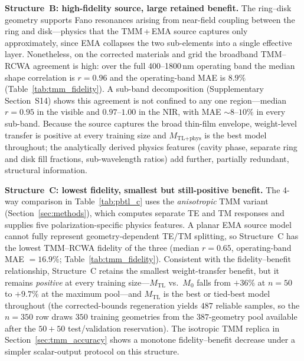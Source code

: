 \documentclass[a4paper,fleqn]{cas-sc}
\newcommand{\Mzero}{M_0}
\newcommand{\Mtl}{M_\text{TL}}
\newcommand{\Mtlphys}{M_\text{TL+phys}}
\begin{document}
\textbf{Structure~B: high-fidelity source, large retained benefit.} The ring--disk geometry supports Fano resonances arising from near-field coupling between the ring and disk---physics that the TMM\,+\,EMA source captures only approximately, since EMA collapses the two sub-elements into a single effective layer. Nonetheless, on the corrected materials and grid the broadband TMM--RCWA agreement is high: over the full 400--1800\,nm operating band the median shape correlation is $r = 0.96$ and the operating-band MAE is $8.9\%$ (Table~\ref{tab:tmm_fidelity}). A sub-band decomposition (Supplementary Section~S14) shows this agreement is not confined to any one region---median $r = 0.95$ in the visible and $0.97$--$1.00$ in the NIR, with MAE ${\sim}8$--$10\%$ in every sub-band. Because the source captures the broad thin-film envelope, weight-level transfer is positive at every training size and $\Mtlphys$ is the best model throughout; the analytically derived physics features (cavity phase, separate ring and disk fill fractions, sub-wavelength ratios) add further, partially redundant, structural information.

\textbf{Structure~C: lowest fidelity, smallest but still-positive benefit.} The 4-way comparison in Table~\ref{tab:pbtl_c} uses the \emph{anisotropic} TMM variant (Section~\ref{sec:methods}), which computes separate TE and TM responses and supplies five polarization-specific physics features. A planar EMA source model cannot fully represent geometry-dependent TE/TM splitting, so Structure~C has the lowest TMM--RCWA fidelity of the three (median $r = 0.65$, operating-band MAE $= 16.9\%$; Table~\ref{tab:tmm_fidelity}). Consistent with the fidelity--benefit relationship, Structure~C retains the smallest weight-transfer benefit, but it remains \emph{positive} at every training size---$\Mtl$ vs.\ $\Mzero$ falls from $+36\%$ at $n=50$ to $+9.7\%$ at the maximum pool---and $\Mtl$ is the best or tied-best model throughout (the corrected-bounds regeneration yields $487$ reliable samples, so the $n=350$ row draws $350$ training geometries from the $387$-geometry pool available after the $50{+}50$ test/validation reservation). The isotropic TMM replica in Section~\ref{sec:tmm_accuracy} shows a monotone fidelity--benefit decrease under a simpler scalar-output protocol on this structure.
\end{document}
